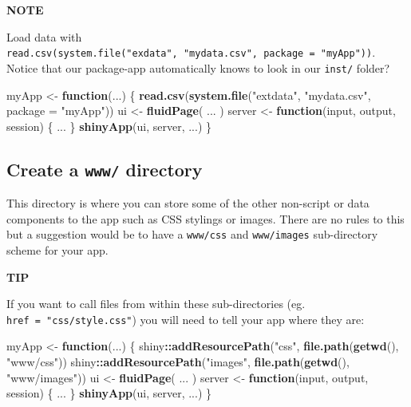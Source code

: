 \documentclass[
]{book}
\newenvironment{Shaded}{\begin{snugshade}}{\end{snugshade}}
\newcommand{\ControlFlowTok}[1]{\textcolor[rgb]{0.13,0.29,0.53}{\textbf{#1}}}
\newcommand{\DataTypeTok}[1]{\textcolor[rgb]{0.13,0.29,0.53}{#1}}
\newcommand{\KeywordTok}[1]{\textcolor[rgb]{0.13,0.29,0.53}{\textbf{#1}}}
\newcommand{\NormalTok}[1]{#1}
\newcommand{\OperatorTok}[1]{\textcolor[rgb]{0.81,0.36,0.00}{\textbf{#1}}}
\newcommand{\StringTok}[1]{\textcolor[rgb]{0.31,0.60,0.02}{#1}}
\begin{document}
\textbf{NOTE}

Load data with \texttt{read.csv(system.file("exdata",\ "mydata.csv",\ package\ =\ "myApp"))}. Notice that our package-app automatically knows to look in our \texttt{inst/} folder?

\begin{Shaded}
\begin{Highlighting}[]
\NormalTok{myApp <-}\StringTok{ }\ControlFlowTok{function}\NormalTok{(...) \{}
  \KeywordTok{read.csv}\NormalTok{(}\KeywordTok{system.file}\NormalTok{(}\StringTok{"extdata"}\NormalTok{, }\StringTok{"mydata.csv"}\NormalTok{, }\DataTypeTok{package =} \StringTok{"myApp"}\NormalTok{))}
\NormalTok{  ui <-}\StringTok{ }\KeywordTok{fluidPage}\NormalTok{(}
\NormalTok{    ...}
\NormalTok{  )}
\NormalTok{  server <-}\StringTok{ }\ControlFlowTok{function}\NormalTok{(input, output, session) \{}
\NormalTok{    ...}
\NormalTok{  \}}
  \KeywordTok{shinyApp}\NormalTok{(ui, server, ...)}
\NormalTok{\}}
\end{Highlighting}
\end{Shaded}

\hypertarget{create-a-www-directory}{%
\subsection{\texorpdfstring{Create a \texttt{www/} directory}{Create a www/ directory}}\label{create-a-www-directory}}

This directory is where you can store some of the other non-script or data components to the app such as CSS stylings or images. There are no rules to this but a suggestion would be to have a \texttt{www/css} and \texttt{www/images} sub-directory scheme for your app.

\textbf{TIP}

If you want to call files from within these sub-directories (eg. \texttt{href\ =\ "css/style.css"}) you will need to tell your app where they are:

\begin{Shaded}
\begin{Highlighting}[]
\NormalTok{myApp <-}\StringTok{ }\ControlFlowTok{function}\NormalTok{(...) \{}
\NormalTok{  shiny}\OperatorTok{::}\KeywordTok{addResourcePath}\NormalTok{(}\StringTok{"css"}\NormalTok{, }\KeywordTok{file.path}\NormalTok{(}\KeywordTok{getwd}\NormalTok{(), }\StringTok{"www/css"}\NormalTok{))}
\NormalTok{  shiny}\OperatorTok{::}\KeywordTok{addResourcePath}\NormalTok{(}\StringTok{"images"}\NormalTok{, }\KeywordTok{file.path}\NormalTok{(}\KeywordTok{getwd}\NormalTok{(), }\StringTok{"www/images"}\NormalTok{))}
\NormalTok{  ui <-}\StringTok{ }\KeywordTok{fluidPage}\NormalTok{(}
\NormalTok{    ...}
\NormalTok{  )}
\NormalTok{  server <-}\StringTok{ }\ControlFlowTok{function}\NormalTok{(input, output, session) \{}
\NormalTok{    ...}
\NormalTok{  \}}
  \KeywordTok{shinyApp}\NormalTok{(ui, server, ...)}
\NormalTok{\}}
\end{Highlighting}
\end{Shaded}
\end{document}
